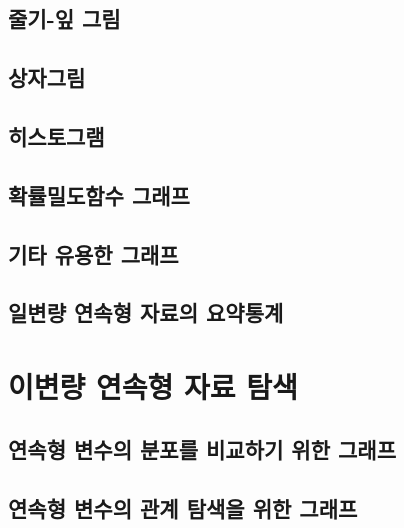 \documentclass[
]{book}
\begin{document}
\hypertarget{uxc904uxae30-uxc78e-uxadf8uxb9bc}{%
\subsection{줄기-잎 그림}\label{uxc904uxae30-uxc78e-uxadf8uxb9bc}}

\hypertarget{uxc0c1uxc790uxadf8uxb9bc}{%
\subsection{상자그림}\label{uxc0c1uxc790uxadf8uxb9bc}}

\hypertarget{uxd788uxc2a4uxd1a0uxadf8uxb7a8}{%
\subsection{히스토그램}\label{uxd788uxc2a4uxd1a0uxadf8uxb7a8}}

\hypertarget{section-prob-density}{%
\subsection{확률밀도함수 그래프}\label{section-prob-density}}

\hypertarget{uxae30uxd0c0-uxc720uxc6a9uxd55c-uxadf8uxb798uxd504}{%
\subsection{기타 유용한 그래프}\label{uxae30uxd0c0-uxc720uxc6a9uxd55c-uxadf8uxb798uxd504}}

\hypertarget{uxc77cuxbcc0uxb7c9-uxc5f0uxc18duxd615-uxc790uxb8ccuxc758-uxc694uxc57duxd1b5uxacc4}{%
\subsection{일변량 연속형 자료의 요약통계}\label{uxc77cuxbcc0uxb7c9-uxc5f0uxc18duxd615-uxc790uxb8ccuxc758-uxc694uxc57duxd1b5uxacc4}}

\hypertarget{uxc774uxbcc0uxb7c9-uxc5f0uxc18duxd615-uxc790uxb8cc-uxd0d0uxc0c9}{%
\section{이변량 연속형 자료 탐색}\label{uxc774uxbcc0uxb7c9-uxc5f0uxc18duxd615-uxc790uxb8cc-uxd0d0uxc0c9}}

\hypertarget{uxc5f0uxc18duxd615-uxbcc0uxc218uxc758-uxbd84uxd3ecuxb97c-uxbe44uxad50uxd558uxae30-uxc704uxd55c-uxadf8uxb798uxd504}{%
\subsection{연속형 변수의 분포를 비교하기 위한 그래프}\label{uxc5f0uxc18duxd615-uxbcc0uxc218uxc758-uxbd84uxd3ecuxb97c-uxbe44uxad50uxd558uxae30-uxc704uxd55c-uxadf8uxb798uxd504}}

\hypertarget{uxc5f0uxc18duxd615-uxbcc0uxc218uxc758-uxad00uxacc4-uxd0d0uxc0c9uxc744-uxc704uxd55c-uxadf8uxb798uxd504}{%
\subsection{연속형 변수의 관계 탐색을 위한 그래프}\label{uxc5f0uxc18duxd615-uxbcc0uxc218uxc758-uxad00uxacc4-uxd0d0uxc0c9uxc744-uxc704uxd55c-uxadf8uxb798uxd504}}

  
\end{document}
